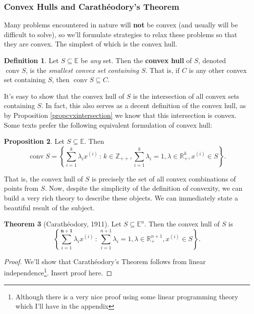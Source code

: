 \documentclass{article}
\numberwithin{equation}{section}
\theoremstyle{definition}
\newtheorem{theorem}{Theorem}[section]
\newtheorem{proposition}[theorem]{Proposition}
\newtheorem{definition}[theorem]{Definition}%
\newcommand{\bE}{\mathbb{E}}
\newcommand{\bR}{\mathbb{R}}
\newcommand{\bZ}{\mathbb{Z}}
\newcommand{\set}[2]{\left\{#1\,:\,#2\right\}}
\newcommand{\conv}{\operatorname{conv}}
\begin{document}
\subsubsection{Convex Hulls and Carath\'eodory's Theorem}
Many problems encountered in nature will \textbf{not} be convex (and usually will be difficult to solve), so we'll formulate strategies to relax these problems so that they are convex. The simplest of which is the convex hull.
\begin{definition}
    Let $S\subseteq\bE$ be \textit{any} set. Then the \textbf{convex hull} of $S$, denoted $\conv S$, is the \textit{smallest convex set containing $S$}. That is, if $C$ is any other convex set containing $S$, then $\conv S\subseteq C$.
\end{definition}
It's easy to show that the convex hull of $S$ is the intersection of all convex sets containing $S$. In fact, this also serves as a decent definition of the convex hull, as by Proposition \ref{propcvxintersection} we know that this intersection is convex. Some texts prefer the following equivalent formulation of convex hull:
\begin{proposition}
    Let $S\subseteq\bE$. Then
    \begin{equation}
        \conv S=\set{\sum_{i=1}^k\lambda_ix^{(i)}}{k\in \bZ_{++}, \sum_{i=1}^k\lambda_i=1, \lambda\in \bR_+^k, x^{(i)}\in S}.
    \end{equation}
\end{proposition}
That is, the convex hull of $S$ is precisely the set of all convex combinations of points from $S$. Now, despite the simplicity of the definition of convexity, we can build a very rich theory to describe these objects.
We can immediately state a beautiful result of the subject.
\begin{theorem}[Carath\'eodory, 1911]
    \label{thmcaratheodory}%
    Let $S\subseteq\bE^n$. Then the convex hull of $S$ is
    \begin{equation}
        \label{thmcaratheodoryeq}
        \set{\sum_{i=1}^{\mathbf{n+1}}\lambda_ix^{(i)}}{ \sum_{i=1}^{n+1}\lambda_i=1, \lambda\in \bR_+^{n+1}, x^{(i)}\in S}.
    \end{equation}
\end{theorem}
\begin{proof}
    We'll show that Carath\'eodory's Theorem follows from linear independence\footnote{Although there is a very nice proof using some linear programming theory which I'll have in the appendix}. Insert proof here.
\end{proof}
\end{document}
